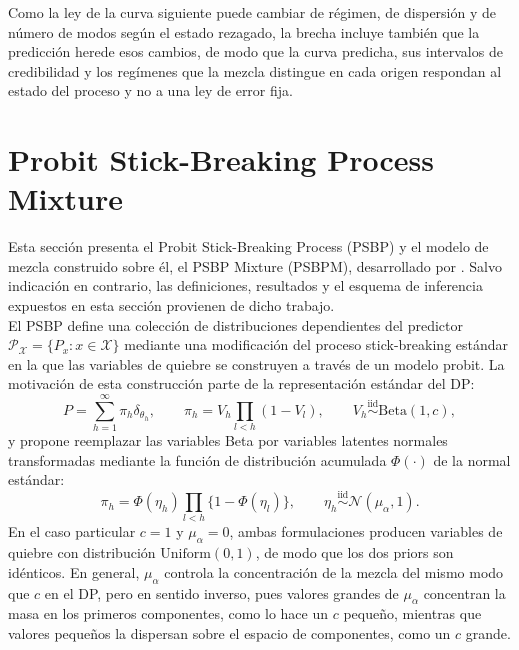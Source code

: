 Como la ley de la curva siguiente puede cambiar de régimen, de dispersión y de número de modos según el estado rezagado, la brecha incluye también que la predicción herede esos cambios, de modo que la curva predicha, sus intervalos de credibilidad y los regímenes que la mezcla distingue en cada origen respondan al estado del proceso y no a una ley de error fija.

\section{Probit Stick-Breaking Process Mixture}
\label{03_03_00_psbp}
Esta sección presenta el Probit Stick-Breaking Process (PSBP) y el modelo de mezcla construido sobre él, el PSBP Mixture (PSBPM), desarrollado por \citet{03_02_chung2009nonparametric}. Salvo indicación en contrario, las definiciones, resultados y el esquema de inferencia expuestos en esta sección provienen de dicho trabajo.\\

El PSBP define una colección de distribuciones dependientes del predictor $\mathcal{P}_{\mathcal{X}} = \{P_x : x \in \mathcal{X}\}$ mediante una modificación del proceso stick-breaking estándar en la que las variables de quiebre se construyen a través de un modelo probit. La motivación de esta construcción parte de la representación estándar del DP:
\begin{equation}
    P = \sum_{h=1}^{\infty} \pi_h \delta_{\theta_h},
    \qquad \pi_h = V_h \prod_{l < h}(1 - V_l),
    \qquad V_h \overset{\mathrm{iid}}{\sim} \mathrm{Beta}(1, c),
\end{equation}
y propone reemplazar las variables Beta por variables latentes normales transformadas mediante la función de distribución acumulada $\Phi(\cdot)$ de la normal estándar:
\begin{equation}\label{eq:psbp_base}
    \pi_h = \Phi(\eta_h) \prod_{l < h}\bigl\{1 - \Phi(\eta_l)\bigr\},
    \qquad \eta_h \overset{\mathrm{iid}}{\sim} \mathcal{N}(\mu_\alpha, 1).
\end{equation}
En el caso particular $c = 1$ y $\mu_\alpha = 0$, ambas formulaciones producen variables de quiebre con distribución $\mathrm{Uniform}(0,1)$, de modo que los dos priors son idénticos. En general, $\mu_\alpha$ controla la concentración de la mezcla del mismo modo que $c$ en el DP, pero en sentido inverso, pues valores grandes de $\mu_\alpha$ concentran la masa en los primeros componentes, como lo hace un $c$ pequeño, mientras que valores pequeños la dispersan sobre el espacio de componentes, como un $c$ grande.\\
 
